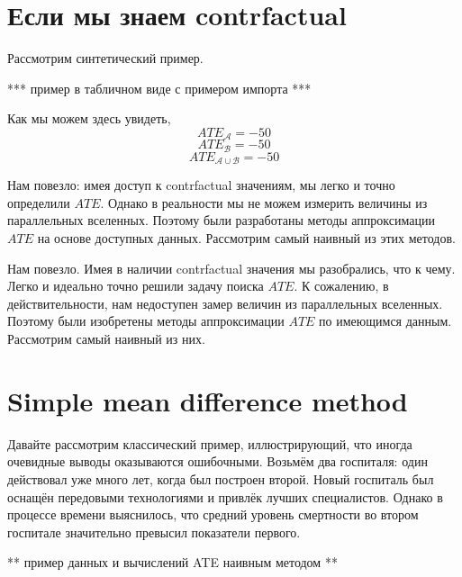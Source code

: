 \documentclass{article}
\DeclareMathOperator{\E}{\mathbb{E}}
\begin{document}


    \section*{Если мы знаем contrfactual}
        Рассмотрим синтетический пример.

        *** пример в табличном виде с примером импорта ***

        Как мы можем здесь увидеть,
        $$ATE_{\mathcal{A}} = -50$$
        $$ATE_{\mathcal{B}} = -50$$
        $$ATE_{\mathcal{A} \cup \mathcal{B}} = -50$$

        Нам повезло: имея доступ к contrfactual значениям, мы легко и точно определили $ATE$. Однако в реальности мы не можем измерить величины из параллельных вселенных. Поэтому были разработаны методы аппроксимации $ATE$ на основе доступных данных. Рассмотрим самый наивный из этих методов.

        Нам повезло. Имея в наличии contrfactual значения мы разобрались, что к чему. Легко и идеально точно решили задачу поиска $ATE$. К сожалению, в действительности, нам недоступен замер величин из параллельных вселенных. Поэтому были изобретены методы аппроксимации $ATE$ по имеющимся данным. Рассмотрим самый наивный из них.



    \section*{Simple mean difference method}

        Давайте рассмотрим классический пример, иллюстрирующий, что иногда очевидные выводы оказываются ошибочными. Возьмём два госпиталя: один действовал уже много лет, когда был построен второй. Новый госпиталь был оснащён передовыми технологиями и привлёк лучших специалистов. Однако в процессе времени выяснилось, что средний уровень смертности во втором госпитале значительно превысил показатели первого.

        ** пример данных и вычислений ATE наивным методом **
\end{document}
